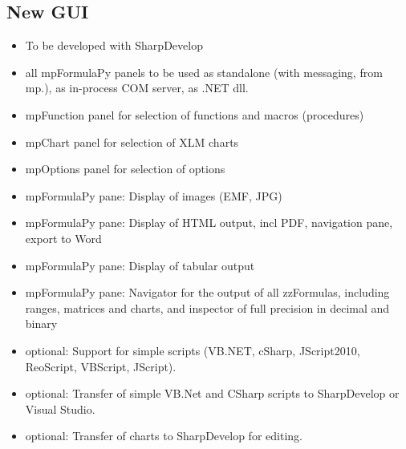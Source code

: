 	\subsection{New GUI}
	\begin{itemize}
		\item To be developed with SharpDevelop
		
		\item all mpFormulaPy panels to be used as standalone (with messaging, from mp.), as in-process COM server, as .NET dll.
		\item mpFunction panel for selection of functions and macros (procedures)
		\item mpChart panel for selection of XLM charts
		\item mpOptions panel for selection of options
		
		\item mpFormulaPy pane: Display of images (EMF, JPG)
		\item mpFormulaPy pane: Display of HTML output, incl PDF, navigation pane, export to Word
		\item mpFormulaPy pane: Display of tabular output	
		\item mpFormulaPy pane: Navigator for the output of all zzFormulas, including ranges, matrices and charts, and inspector of full precision in decimal and binary
		\item optional: Support for simple scripts (VB.NET, cSharp, JScript2010, ReoScript, VBScript, JScript).
		\item optional: Transfer of simple VB.Net and CSharp scripts to SharpDevelop or Visual Studio.
		\item optional: Transfer of charts to SharpDevelop for editing.
		
	\end{itemize}
	
	
	
	
	
